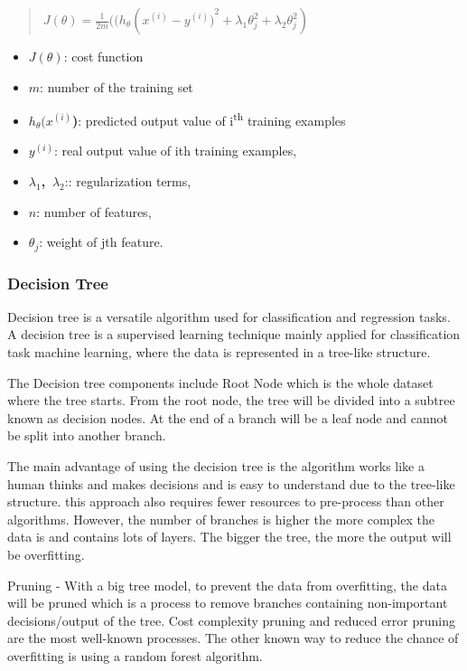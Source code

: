 \begin{quote}
    
    \(J(\theta) = \frac{1}{2m}((h_{\theta}(x^{(i)} - {y^{(i)})}^{2} + \lambda_{1}\theta_{j}^{2} + \lambda_{2}\theta_{j}^{2})\)
\end{quote}


\begin{itemize}
    \item \(J(\theta)\): cost function
    \item \(m\): number of the training set
    \item \(h_{\theta}(x^{(i)}\)\textbf{)}: predicted output value of
    i\textsuperscript{th} training examples
    \item \(y^{(i)}\): real output value of ith training examples,
    \item \(\lambda_{1}\)\textbf{,} \({\ \lambda}_{2}\):: regularization terms,
    \item \(n\): number of features,
    \item \(\theta_{j}\): weight of jth feature.
\end{itemize}

\subsubsection{Decision Tree}
Decision tree is a versatile algorithm used for classification and regression tasks\cite{DecisionTree}. A decision tree is a supervised learning technique mainly applied for classification task machine learning, where the data is represented in a tree-like structure. 

The Decision tree components include Root Node which is the whole dataset where the tree starts. From the root node, the tree will be divided into a subtree known as decision nodes. At the end of a branch will be a leaf node and cannot be split into another branch.

The main advantage of using the decision tree is the algorithm works like a human thinks and makes decisions and is easy to understand due to the tree-like structure. this approach also requires fewer resources to pre-process than other algorithms. However, the number of branches is higher the more complex the data is and contains lots of layers. The bigger the tree, the more the output will be overfitting.

Pruning - With a big tree model, to prevent the data from overfitting, the data will be pruned which is a process to remove branches containing non-important decisions/output of the tree. Cost complexity pruning and reduced error pruning are the most well-known processes. The other known way to reduce the chance of overfitting is using a random forest algorithm.


